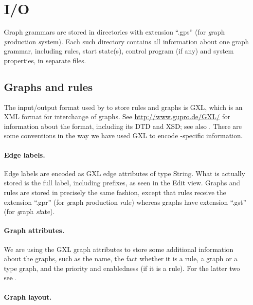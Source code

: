 \clearpage
\section{I/O}

Graph grammars are stored in directories with extension ``\textsf{.gps}'' (for
\emph{g}raph \emph{p}roduction \emph{s}ystem). Each such directory contains all
information about one graph grammar, including rules, start state(s), control
program (if any) and system properties, in separate files.

\subsection{Graphs and rules}

The input/output format used by \GROOVE to store rules and graphs is GXL,
which is an XML format for interchange of graphs. See
\url{http://www.gupro.de/GXL/} for information about the format, including its
DTD and XSD; see also \cite{GXL}. There are some conventions in the way we have
used GXL to encode \GROOVE-specific information.

\paragraph{Edge labels.}

Edge labels are encoded as GXL edge attributes of type \textsf{String}. What is
actually stored is the full label, including prefixes, as seen in the Edit
view. Graphs and rules are stored in precisely the same fashion, except that
rules receive the extension ``\textsf{.gpr}'' (for \emph{g}raph
\emph{p}roduction \emph{r}ule) whereas graphs have extension ``\textsf{.gst}''
(for \emph{g}raph \emph{st}ate).

\paragraph{Graph attributes.}

We are using the GXL graph attributes to store some additional information
about the graphs, such as the name, the fact whether it is a rule, a graph or a
type graph, and the priority and enabledness (if it is a rule). For the latter
two see .

\paragraph{Graph layout.}

